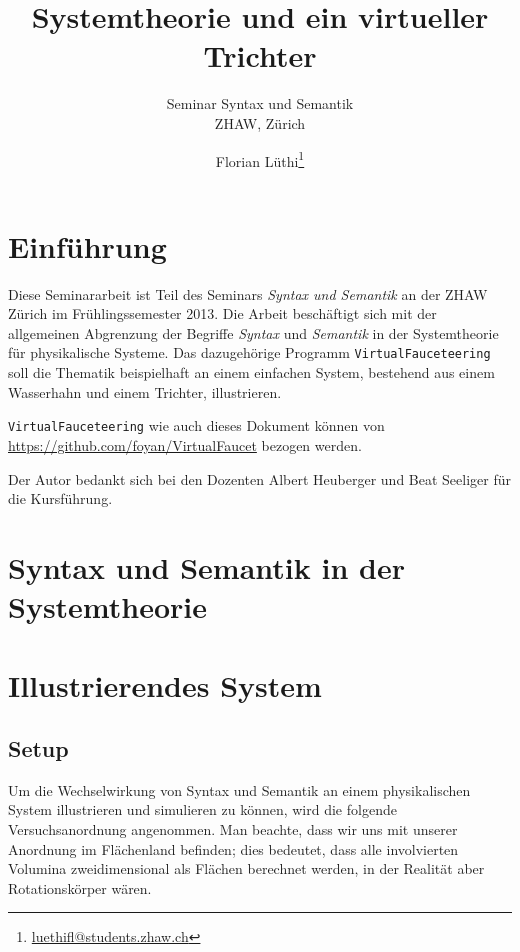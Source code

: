 \documentclass[11pt]{scrreprt} %
\title{Systemtheorie und ein virtueller Trichter}
\subtitle{Seminar Syntax und Semantik \\ ZHAW, Zürich}
\author{Florian Lüthi\footnote{\url{luethifl@students.zhaw.ch}}}
\theoremstyle{definition}
\begin{document}
\maketitle

\tableofcontents

\chapter{Einführung}

Diese Seminararbeit ist Teil des Seminars {\it{Syntax und Semantik}} an der ZHAW Zürich im Frühlingssemester 2013. Die Arbeit beschäftigt sich mit der allgemeinen Abgrenzung der Begriffe {\it Syntax} und {\it Semantik} in der Systemtheorie für physikalische Systeme. Das dazugehörige Programm {\tt VirtualFauceteering} soll die Thematik beispielhaft an einem einfachen System, bestehend aus einem Wasserhahn und einem Trichter, illustrieren.

{\tt VirtualFauceteering} wie auch dieses Dokument können von \url{https://github.com/foyan/VirtualFaucet} bezogen werden.

Der Autor bedankt sich bei den Dozenten Albert Heuberger und Beat Seeliger für die Kursführung.

\chapter{Syntax und Semantik in der Systemtheorie}

\chapter{Illustrierendes System}

\section{Setup}

Um die Wechselwirkung von Syntax und Semantik an einem physikalischen System illustrieren und simulieren zu können, wird die folgende Versuchsanordnung angenommen. Man beachte, dass wir uns mit unserer Anordnung im Flächenland befinden; dies bedeutet, dass  alle involvierten Volumina zweidimensional als Flächen berechnet werden, in der Realität aber Rotationskörper wären.
\end{document}
